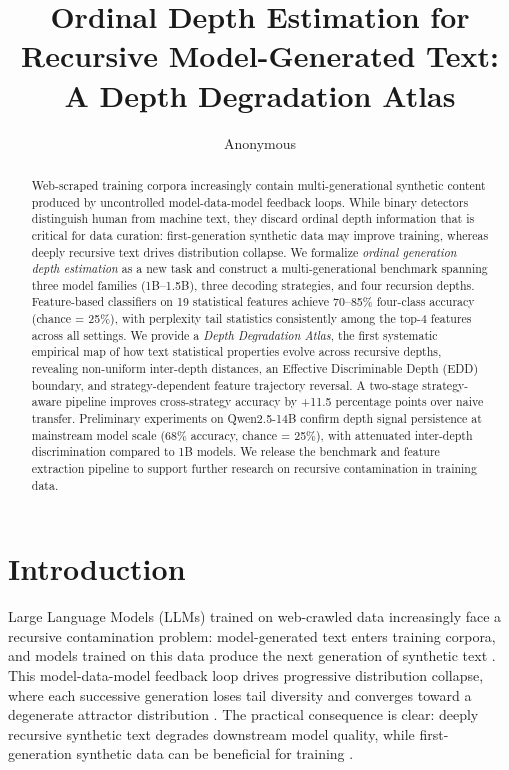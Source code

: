 \documentclass[11pt,a4paper]{article}
\title{Ordinal Depth Estimation for Recursive Model-Generated Text:\\A Depth Degradation Atlas}
\author{Anonymous}
\date{}
\begin{document}
\maketitle

\begin{abstract}
Web-scraped training corpora increasingly contain multi-generational synthetic content produced by uncontrolled model-data-model feedback loops. While binary detectors distinguish human from machine text, they discard ordinal depth information that is critical for data curation: first-generation synthetic data may improve training, whereas deeply recursive text drives distribution collapse. We formalize \textit{ordinal generation depth estimation} as a new task and construct a multi-generational benchmark spanning three model families (1B--1.5B), three decoding strategies, and four recursion depths. Feature-based classifiers on 19 statistical features achieve 70--85\% four-class accuracy (chance = 25\%), with perplexity tail statistics consistently among the top-4 features across all settings. We provide a \textit{Depth Degradation Atlas}, the first systematic empirical map of how text statistical properties evolve across recursive depths, revealing non-uniform inter-depth distances, an Effective Discriminable Depth (EDD) boundary, and strategy-dependent feature trajectory reversal. A two-stage strategy-aware pipeline improves cross-strategy accuracy by +11.5 percentage points over naive transfer. Preliminary experiments on Qwen2.5-14B confirm depth signal persistence at mainstream model scale (68\% accuracy, chance = 25\%), with attenuated inter-depth discrimination compared to 1B models. We release the benchmark and feature extraction pipeline to support further research on recursive contamination in training data.
\end{abstract}

\section{Introduction}

Large Language Models (LLMs) trained on web-crawled data increasingly face a recursive contamination problem: model-generated text enters training corpora, and models trained on this data produce the next generation of synthetic text \citep{shumailov2024ai,alemohammad2024selfconsuming}. This model-data-model feedback loop drives progressive distribution collapse, where each successive generation loses tail diversity and converges toward a degenerate attractor distribution \citep{dohmatob2024tale,gerstgrasser2024model}. The practical consequence is clear: deeply recursive synthetic text degrades downstream model quality, while first-generation synthetic data can be beneficial for training \citep{drayson2025quality}.
\end{document}
